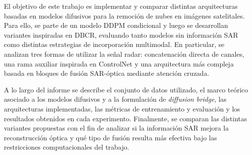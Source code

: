 El objetivo de este trabajo es implementar y comparar distintas arquitecturas basadas en modelos difusivos para la remoción de nubes en imágenes satelitales. Para ello, se parte de un modelo DDPM condicional y luego se desarrollan variantes inspiradas en DBCR, evaluando tanto modelos sin información SAR como distintas estrategias de incorporación multimodal. En particular, se analizan tres formas de utilizar la señal radar: concatenación directa de canales, una rama auxiliar inspirada en ControlNet y una arquitectura más compleja basada en bloques de fusión SAR-óptica mediante atención cruzada.

A lo largo del informe se describe el conjunto de datos utilizado, el marco teórico asociado a los modelos difusivos y a la formulación de \textit{diffusion bridge}, las arquitecturas implementadas, las métricas de entrenamiento y evaluación y los resultados obtenidos en cada experimento. Finalmente, se comparan las distintas variantes propuestas con el fin de analizar si la información SAR mejora la reconstrucción óptica y qué tipo de fusión resulta más efectiva bajo las restricciones computacionales del trabajo.
